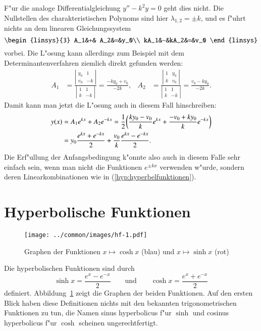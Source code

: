 \documentclass[a4paper,12pt]{article}
\begin{document}
F"ur die analoge Differentialgleichung $y''-k^2y=0$ geht dies nicht.
Die Nullstellen des charakteristischen Polynoms sind hier 
$\lambda_{1,2}=\pm k$, und es f"uhrt nichts an dem linearen Gleichungssystem
\[
\begin{linsys}{3}
 A_1&+& A_2&=&y_0\\
kA_1&-&kA_2&=&v_0
\end{linsys}
\]
vorbei.
Die L"osung kann allerdings zum Beispiel mit dem Determinantenverfahren
ziemlich direkt gefunden werden:
\begin{align*}
A_1
&=
\frac{\left|\begin{matrix}y_0&1\\v_0&-k\end{matrix}\right|}{\left|\begin{matrix}1&1\\k&-k\end{matrix}\right|}
=
\frac{-ky_0+v_0}{-2k},
&
A_2
&=
\frac{\left|\begin{matrix}1&y_0\\k&v_0\end{matrix}\right|}{\left|\begin{matrix}1&1\\k&-k\end{matrix}\right|}
=\frac{v_0-ky_0}{-2k}.
\end{align*}
Damit kann man jetzt die L"osung auch in diesem Fall hinschreiben:
\begin{align}
y(x)
&=
A_1e^{kx}+A_2e^{-kx}
=
\frac12\biggl(
\frac{ky_0-v_0}k e^{kx}
+
\frac{-v_0+ky_0}k e^{-kx}
\biggr)
\notag
\\
&=
y_0\frac{e^{kx}+e^{-kx}}2
+\frac{v_0}{k}\frac{e^{kx}-e^{-kx}}2.
\label{hyp:hyperbelfunktionen}
\end{align}
Die Erf"ullung der Anfangsbedingung k"onnte also auch in diesem Falle
sehr einfach sein, wenn man nicht die Funktionen $e^{\pm kx}$ verwenden
w"urde, sondern deren Linearkombinationen wie in (\ref{hyp:hyperbelfunktionen}).

\section{Hyperbolische Funktionen}
\begin{figure}
\centering
\texttt{[image: ../common/images/hf-1.pdf]}
\caption{Graphen der Funktionen $x\mapsto\cosh x$ (blau)
und $x\mapsto\sinh x$ (rot)
\label{hyp:graphen}}
\end{figure}
Die hyperbolischen Funktionen sind durch
\[
\sinh x =\frac{e^x-e^{-x}}2
\qquad\text{und}\qquad
\cosh x = \frac{e^x+e^{-x}}2
\]
definiert.
Abbildung~\ref{hyp:graphen} zeigt die Graphen der beiden Funktionen.
Auf den ersten Blick haben diese Definitionen nichts mit den bekannten
trigonometrischen Funktionen zu tun, die Namen sinus hyperbolicus f"ur
$\sinh$ und cosinus hyperbolicus f"ur $\cosh$ scheinen ungerechtfertigt.
\end{document}
